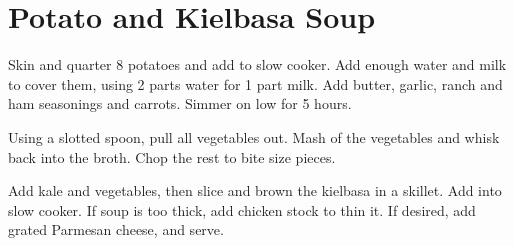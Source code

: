 \section{Potato and Kielbasa Soup}
\begin{recipe}
	
	

	Skin and quarter 8 potatoes and add to slow cooker. Add enough water and milk to cover them, using 2 parts water for 1 part milk. Add butter, garlic, ranch and ham seasonings and carrots. Simmer on low for 5 hours.
	
	Using a slotted spoon, pull all vegetables out. Mash  of the vegetables and whisk back into the broth. Chop the rest to bite size pieces.
	
	
	Add kale and vegetables, then slice and brown the kielbasa in a skillet. Add into slow cooker. If soup is too thick, add chicken stock to thin it. If desired, add grated Parmesan cheese, and serve.
	
\end{recipe}
